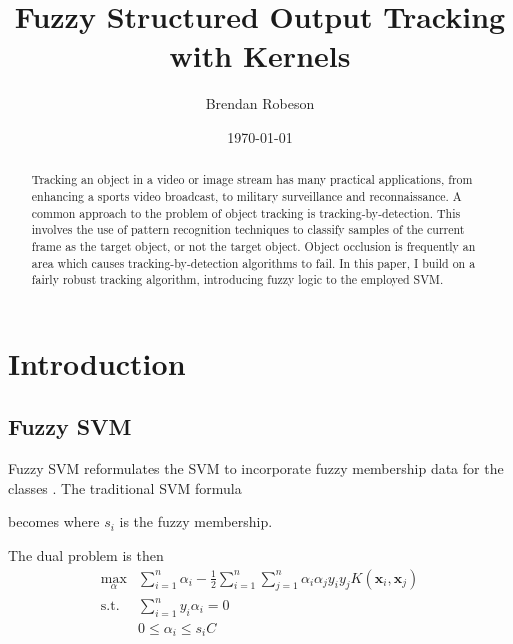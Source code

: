 \documentclass{IEEEtran}
\renewcommand{\vec}[1]{\mathbf{#1}}
\newcommand{\half}{\frac{1}{2}}
\begin{document}
\title{Fuzzy Structured Output Tracking with Kernels}
\author{Brendan Robeson}
\date{\today}
\maketitle

\begin{abstract} %
    Tracking an object in a video or image stream has many practical applications, from enhancing a
    sports video broadcast, to military surveillance and reconnaissance. A common approach to the
    problem of object tracking is tracking-by-detection. This involves the use of pattern
    recognition techniques to classify samples of the current frame as the target object, or not the
    target object. Object occlusion is frequently an area which causes tracking-by-detection
    algorithms to fail. In this paper, I build on a fairly robust tracking algorithm, introducing
    fuzzy logic to the employed SVM.
\end{abstract}

\section{Introduction} %
\subsection{Fuzzy SVM} %
Fuzzy SVM reformulates the SVM to incorporate fuzzy membership data for the classes \cite{991432}. The
traditional SVM formula
\svmEquation

becomes
\fuzzySvmEquation
where \(s_i\) is the fuzzy membership.

The dual problem is then
\begin{align}
    \max_\alpha & \sum_{i=1}^n \alpha_i - \half \sum_{i=1}^n \sum_{j=1}^n \alpha_i \alpha_j
    y_i y_j K\left(\vec{x}_i, \vec{x}_j\right) \\
    \text{s.t. } & \sum_{i=1}^n y_i \alpha_i = 0 \nonumber \\
                 & 0 \le \alpha_i \le s_iC \nonumber
\end{align}
\end{document}
